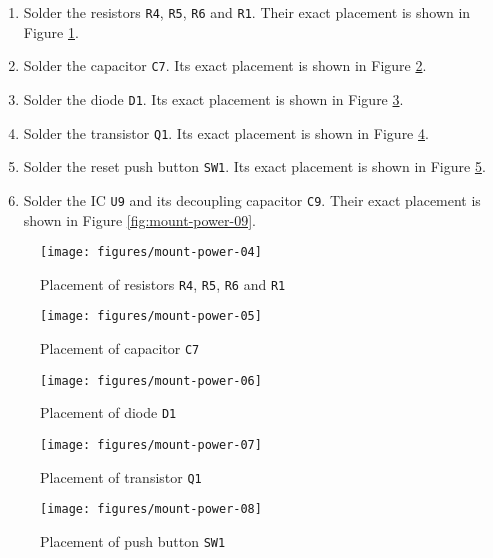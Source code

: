 \begin{enumerate}
  \item Solder the resistors {\tt R4}, {\tt R5}, {\tt R6} and {\tt R1}. Their exact placement is shown in Figure \ref{fig:mount-power-04}.
  \item Solder the capacitor {\tt C7}. Its exact placement is shown in Figure \ref{fig:mount-power-05}.
  \item Solder the diode {\tt D1}. Its exact placement is shown in Figure \ref{fig:mount-power-06}.
  \item Solder the transistor {\tt Q1}. Its exact placement is shown in Figure \ref{fig:mount-power-07}.
  \item Solder the reset push button {\tt SW1}. Its exact placement is shown in Figure \ref{fig:mount-power-08}.
  \item Solder the IC {\tt U9} and its decoupling capacitor {\tt C9}. Their exact placement is shown in Figure \ref{fig:mount-power-09}.
\end{enumerate}

\begin{figure}[htbp]
  \centering
  \texttt{[image: figures/mount-power-04]}
  \caption{Placement of resistors {\tt R4}, {\tt R5}, {\tt R6} and {\tt R1}}
  \label{fig:mount-power-04}
\end{figure}

\begin{figure}[htbp]
  \centering
  \texttt{[image: figures/mount-power-05]}
  \caption{Placement of capacitor {\tt C7}}
  \label{fig:mount-power-05}
\end{figure}

\begin{figure}[htbp]
  \centering
  \texttt{[image: figures/mount-power-06]}
  \caption{Placement of diode {\tt D1}}
  \label{fig:mount-power-06}
\end{figure}

\begin{figure}[htbp]
  \centering
  \texttt{[image: figures/mount-power-07]}
  \caption{Placement of transistor {\tt Q1}}
  \label{fig:mount-power-07}
\end{figure}

\begin{figure}[htbp]
  \centering
  \texttt{[image: figures/mount-power-08]}
  \caption{Placement of push button {\tt SW1}}
  \label{fig:mount-power-08}
\end{figure}

